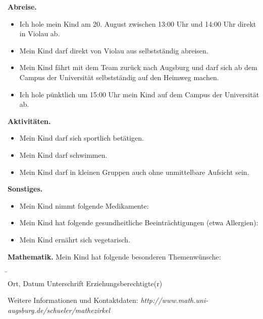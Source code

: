 \documentclass{zettel}
\begin{document}
\begin{shaded}
\textbf{Abreise.}
\begin{itemize}
\item[\checkbox] Ich hole mein Kind am 20. August zwischen 13:00 Uhr und 14:00
Uhr direkt in Violau ab.
\item[\checkbox] Mein Kind darf direkt von Violau aus selbstständig abreisen.
\item[\checkbox] Mein Kind fährt mit dem Team zurück nach Augsburg und darf sich
ab dem Campus der Universität selbstständig auf den Heimweg machen.
\item[\checkbox] Ich hole pünktlich um 15:00 Uhr mein Kind auf dem Campus der
Universität ab.
\end{itemize}
\end{shaded}

\begin{shaded}
\textbf{Aktivitäten.}
\begin{itemize}
  \item[\checkbox] Mein Kind darf sich sportlich betätigen.
  \item[\checkbox] Mein Kind darf schwimmen.
  \item[\checkbox] Mein Kind darf in kleinen Gruppen auch ohne unmittelbare
  Aufsicht sein.
\end{itemize}
\end{shaded}

\begin{shaded}
\textbf{Sonstiges.}
\begin{itemize}
  \item[\checkbox] Mein Kind nimmt folgende Medikamente: \\[1em] \freistLang
  \item[\checkbox] Mein Kind hat folgende gesundheitliche Beeinträchtigungen
  (etwa Allergien): \\[1em] \freistLang
  \item[\checkbox] Mein Kind ernährt sich vegetarisch.
\end{itemize}
\end{shaded}

\begin{shaded}
\textbf{Mathematik.} Mein Kind hat folgende besonderen Themenwünsche: \\[1em]
\freistLang
\end{shaded}

\vfill

\begin{tabbing}
  \freistMittel \qquad\qquad \= \kill
  \freistMittel \> \freistLaenger \\
  Ort, Datum \> Unterschrift Erziehungsberechtigte(r)
\end{tabbing}

\scriptsize
Weitere Informationen und Kontaktdaten:
\textsl{http:/\!/www.math.uni-augsburg.de/schueler/mathezirkel}
\end{document}
